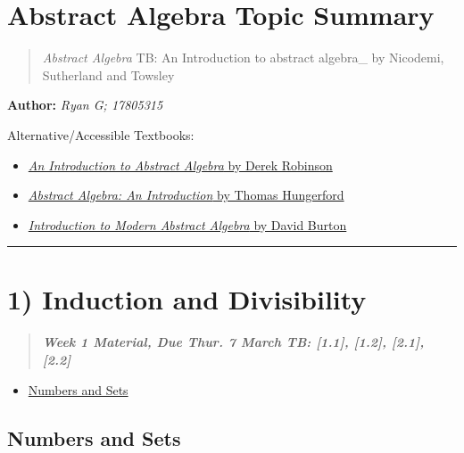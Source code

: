 \documentclass[
]{article}
\date{}
\begin{document}
\hypertarget{header-n2}{%
\section{Abstract Algebra Topic Summary}\label{header-n2}}

\begin{quote}
\emph{Abstract Algebra} TB: An Introduction to abstract algebra\_ by
Nicodemi, Sutherland and Towsley
\end{quote}

\textbf{Author:} \emph{Ryan G; 17805315}

Alternative/Accessible Textbooks:

\begin{itemize}
\item
  \href{http://booksdescr.org/item/index.php?md5=8116F6EE260EE2681415ABFD600696AC}{\emph{An
  Introduction to Abstract Algebra} by Derek Robinson}
\item
  \href{http://booksdescr.org/item/index.php?md5=7519238B77AC24ABEEB6B3F4A0A1392F}{\emph{Abstract
  Algebra: An Introduction} by Thomas Hungerford}
\item
  \href{http://booksdescr.org/item/index.php?md5=D4CCAD47CC508CFE7C7DD857AB0AEF98}{\emph{Introduction
  to Modern Abstract Algebra} by David Burton}
\end{itemize}

\tableofcontents

\begin{center}\rule{0.5\linewidth}{\linethickness}\end{center}

\hypertarget{header-n17}{%
\section{1) Induction and Divisibility}\label{header-n17}}

\begin{quote}
\textbf{\emph{Week 1 Material, Due Thur. 7 March TB: {[}1.1{]},
{[}1.2{]}, {[}2.1{]}, {[}2.2{]} }}
\end{quote}

\begin{itemize}
\item
  \protect\hyperlink{aaux281ux29sets}{Numbers and Sets}
\end{itemize}

\hypertarget{header-n26}{%
\subsection{Numbers and Sets}\label{header-n26}}
\end{document}
